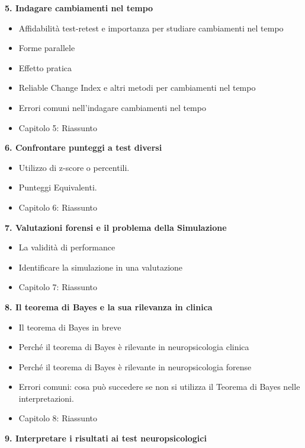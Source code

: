\documentclass[
  italian,
  letterpaper,
  paper=A4,
  headinclude=on,
  footinclude=on,
  12pt]{scrbook}
\providecommand{\tightlist}{%
  \setlength{\itemsep}{0pt}\setlength{\parskip}{0pt}}
\begin{document}
\textbf{5. Indagare cambiamenti nel tempo}

\begin{itemize}
\tightlist
\item
  Affidabilità test-retest e importanza per studiare cambiamenti nel
  tempo
\item
  Forme parallele
\item
  Effetto pratica
\item
  Reliable Change Index e altri metodi per cambiamenti nel tempo
\item
  Errori comuni nell'indagare cambiamenti nel tempo
\item
  Capitolo 5: Riassunto
\end{itemize}

\textbf{6. Confrontare punteggi a test diversi}

\begin{itemize}
\tightlist
\item
  Utilizzo di z-score o percentili.
\item
  Punteggi Equivalenti.
\item
  Capitolo 6: Riassunto
\end{itemize}

\textbf{7. Valutazioni forensi e il problema della Simulazione}

\begin{itemize}
\tightlist
\item
  La validità di performance
\item
  Identificare la simulazione in una valutazione
\item
  Capitolo 7: Riassunto
\end{itemize}

\textbf{8. Il teorema di Bayes e la sua rilevanza in clinica}

\begin{itemize}
\tightlist
\item
  Il teorema di Bayes in breve
\item
  Perché il teorema di Bayes è rilevante in neuropsicologia clinica
\item
  Perché il teorema di Bayes è rilevante in neuropsicologia forense
\item
  Errori comuni: cosa può succedere se non si utilizza il Teorema di
  Bayes nelle interpretazioni.
\item
  Capitolo 8: Riassunto
\end{itemize}

\textbf{9. Interpretare i risultati ai test neuropsicologici}
\end{document}
